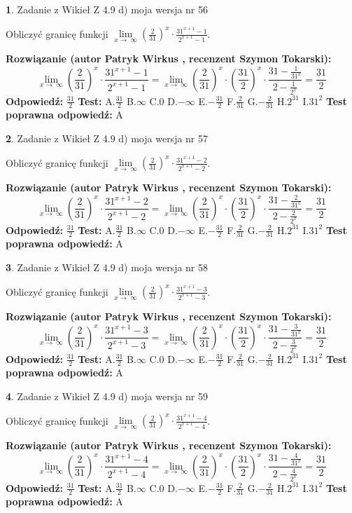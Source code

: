 \documentclass[12pt, a4paper]{article}
\theoremstyle{definition} %
\newtheorem{zad}{}
\newcommand{\zadStart}[1]{\begin{zad}#1\newline}
\newcommand{\zadStop}{\end{zad}}
\newcommand{\rozwStart}[2]{\noindent \textbf{Rozwiązanie (autor #1 , recenzent #2): }\newline}
\newcommand{\rozwStop}{\newline}
\newcommand{\odpStart}{\noindent \textbf{Odpowiedź:}\newline}
\newcommand{\odpStop}{\newline}
\newcommand{\testStart}{\noindent \textbf{Test:}\newline}
\newcommand{\testStop}{\newline}
\newcommand{\kluczStart}{\noindent \textbf{Test poprawna odpowiedź:}\newline}
\newcommand{\kluczStop}{\newline}
\begin{document}
\zadStart{Zadanie z Wikieł Z 4.9 d) moja wersja nr 56}


Obliczyć granicę funkcji  $\lim\limits_{x\to\ \infty}(\frac{2}{31})^{x}\cdot\frac{31^{x+1}-1}{2^{x+1}-1}$.
\zadStop
\rozwStart{Patryk Wirkus}{Szymon Tokarski}
$$\lim\limits_{x\to\ \infty}(\frac{2}{31})^{x}\cdot\frac{31^{x+1}-1}{2^{x+1}-1}=\lim\limits_{x\to\ \infty}(\frac{2}{31})^{x}\cdot(\frac{31}{2})^{x} \cdot \frac{31-\frac{1}{31^{x}}}{2-\frac{1}{2^{x}}} = \frac{31}{2}$$
\rozwStop
\odpStart
$\frac{31}{2}$
\odpStop
\testStart
A.$\frac{31}{2}$ B.$\infty$ C.$0$ D.$-\infty$ E.$-\frac{31}{2}$
F.$\frac{2}{31}$ G.$-\frac{2}{31}$
H.$2^{31}$
I.$31^{2}$
\testStop
\kluczStart
A
\kluczStop



\zadStart{Zadanie z Wikieł Z 4.9 d) moja wersja nr 57}


Obliczyć granicę funkcji  $\lim\limits_{x\to\ \infty}(\frac{2}{31})^{x}\cdot\frac{31^{x+1}-2}{2^{x+1}-2}$.
\zadStop
\rozwStart{Patryk Wirkus}{Szymon Tokarski}
$$\lim\limits_{x\to\ \infty}(\frac{2}{31})^{x}\cdot\frac{31^{x+1}-2}{2^{x+1}-2}=\lim\limits_{x\to\ \infty}(\frac{2}{31})^{x}\cdot(\frac{31}{2})^{x} \cdot \frac{31-\frac{2}{31^{x}}}{2-\frac{2}{2^{x}}} = \frac{31}{2}$$
\rozwStop
\odpStart
$\frac{31}{2}$
\odpStop
\testStart
A.$\frac{31}{2}$ B.$\infty$ C.$0$ D.$-\infty$ E.$-\frac{31}{2}$
F.$\frac{2}{31}$ G.$-\frac{2}{31}$
H.$2^{31}$
I.$31^{2}$
\testStop
\kluczStart
A
\kluczStop



\zadStart{Zadanie z Wikieł Z 4.9 d) moja wersja nr 58}


Obliczyć granicę funkcji  $\lim\limits_{x\to\ \infty}(\frac{2}{31})^{x}\cdot\frac{31^{x+1}-3}{2^{x+1}-3}$.
\zadStop
\rozwStart{Patryk Wirkus}{Szymon Tokarski}
$$\lim\limits_{x\to\ \infty}(\frac{2}{31})^{x}\cdot\frac{31^{x+1}-3}{2^{x+1}-3}=\lim\limits_{x\to\ \infty}(\frac{2}{31})^{x}\cdot(\frac{31}{2})^{x} \cdot \frac{31-\frac{3}{31^{x}}}{2-\frac{3}{2^{x}}} = \frac{31}{2}$$
\rozwStop
\odpStart
$\frac{31}{2}$
\odpStop
\testStart
A.$\frac{31}{2}$ B.$\infty$ C.$0$ D.$-\infty$ E.$-\frac{31}{2}$
F.$\frac{2}{31}$ G.$-\frac{2}{31}$
H.$2^{31}$
I.$31^{2}$
\testStop
\kluczStart
A
\kluczStop



\zadStart{Zadanie z Wikieł Z 4.9 d) moja wersja nr 59}


Obliczyć granicę funkcji  $\lim\limits_{x\to\ \infty}(\frac{2}{31})^{x}\cdot\frac{31^{x+1}-4}{2^{x+1}-4}$.
\zadStop
\rozwStart{Patryk Wirkus}{Szymon Tokarski}
$$\lim\limits_{x\to\ \infty}(\frac{2}{31})^{x}\cdot\frac{31^{x+1}-4}{2^{x+1}-4}=\lim\limits_{x\to\ \infty}(\frac{2}{31})^{x}\cdot(\frac{31}{2})^{x} \cdot \frac{31-\frac{4}{31^{x}}}{2-\frac{4}{2^{x}}} = \frac{31}{2}$$
\rozwStop
\odpStart
$\frac{31}{2}$
\odpStop
\testStart
A.$\frac{31}{2}$ B.$\infty$ C.$0$ D.$-\infty$ E.$-\frac{31}{2}$
F.$\frac{2}{31}$ G.$-\frac{2}{31}$
H.$2^{31}$
I.$31^{2}$
\testStop
\kluczStart
A
\kluczStop
\end{document}
